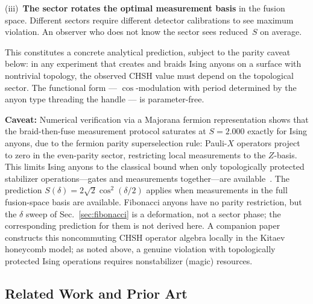 \documentclass[aps,pra,twocolumn,superscriptaddress,showpacs,floatfix]{revtex4-2}
\begin{document}
(iii)~\textbf{The sector rotates the optimal measurement basis} in the fusion
space. Different sectors require different detector calibrations to see maximum
violation. An observer who does not know the sector sees reduced~$S$ on average.

This constitutes a concrete analytical prediction, subject to the parity caveat
below: in any experiment that
creates and braids Ising anyons on a surface with nontrivial topology, the
observed CHSH value must depend on the topological sector. The functional form ---
$\cos$-modulation with period determined by the anyon type threading the handle
--- is parameter-free.

\textbf{Caveat:} Numerical verification via a Majorana fermion representation
shows that the braid-then-fuse measurement protocol saturates at $S = 2.000$
exactly for Ising anyons, due to the fermion parity superselection rule:
Pauli-$X$ operators project to zero in the even-parity sector, restricting local
measurements to the $Z$-basis. This limits Ising anyons to the classical bound when only
topologically protected stabilizer operations---gates and measurements
together---are available~\cite{HowardVala2012}. The prediction
$S(\delta) = 2\sqrt{2}\cos^2(\delta/2)$ applies when measurements in the full
fusion-space basis are available. Fibonacci anyons have no parity restriction,
but the $\delta$ sweep of Sec.~\ref{sec:fibonacci} is a deformation, not a
sector phase; the corresponding prediction for them is not derived here.
A companion paper~\cite{Sayim2026cbell}
constructs this noncommuting CHSH operator algebra locally in the Kitaev
honeycomb model; as noted above, a genuine violation with topologically
protected Ising operations requires nonstabilizer (magic) resources.

\subsection{Related Work and Prior Art}
\label{sec:related_work}
\end{document}
